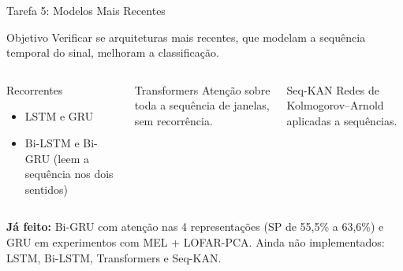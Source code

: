 \documentclass[aspectratio=169]{beamer}
\begin{document}
\begin{frame}{Tarefa 5: Modelos Mais Recentes}
    \footnotesize
    \begin{block}{\small Objetivo}
        \scriptsize
        Verificar se arquiteturas mais recentes, que modelam a sequência temporal do sinal, melhoram a classificação.
    \end{block}

    \vspace{0.05cm}
    \begin{columns}[t]
        \begin{block}{\small Recorrentes}
            \scriptsize
            \begin{itemize}
                \setlength{\itemsep}{1pt}
                \item LSTM e GRU
                \item Bi-LSTM e Bi-GRU (leem a sequência nos dois sentidos)
            \end{itemize}
        \end{block}

        \begin{block}{\small Transformers}
            \scriptsize
            Atenção sobre toda a sequência de janelas, sem recorrência.
        \end{block}

        \begin{block}{\small Seq-KAN}
            \scriptsize
            Redes de Kolmogorov--Arnold aplicadas a sequências.
        \end{block}
    \end{columns}

    \vspace{0.1cm}
    {\scriptsize\textbf{Já feito:} Bi-GRU com atenção nas 4 representações (SP de 55,5\% a 63,6\%) e GRU em experimentos com MEL + LOFAR-PCA. Ainda não implementados: LSTM, Bi-LSTM, Transformers e Seq-KAN.\par}
\end{frame}
\end{document}
